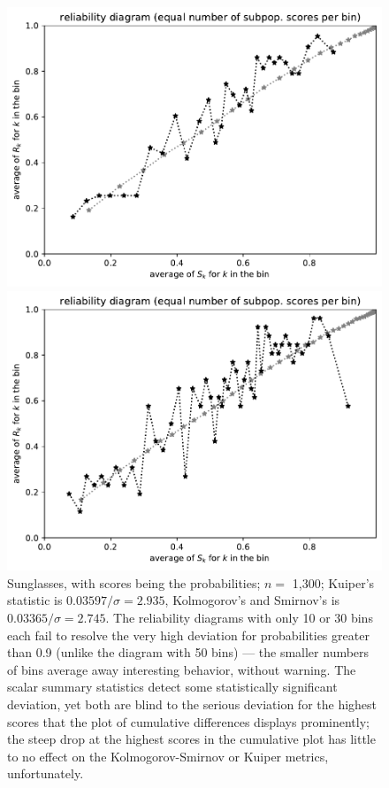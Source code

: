 \documentclass{article}
\begin{document}
\begin{figure}
\begin{centering}
\parbox{\imsize}{\includegraphics[width=\imsize]
{./codes/unweighted/prob-1-837-sunglasses-dark-glasses-shadesequisamps30}}
\quad\quad
\parbox{\imsize}{\includegraphics[width=\imsize]
{./codes/unweighted/prob-1-837-sunglasses-dark-glasses-shadesequisamps50}}

\end{centering}
\caption{Sunglasses, with scores being the probabilities;
         $n =$ 1,300; Kuiper's statistic is $0.03597 / \sigma = 2.935$,
         Kolmogorov's and Smirnov's is $0.03365 / \sigma = 2.745$.
The reliability diagrams with only 10 or 30 bins each
fail to resolve the very high deviation
for probabilities greater than 0.9 (unlike the diagram with 50 bins) ---
the smaller numbers of bins average away interesting behavior, without warning.
The scalar summary statistics detect some statistically significant deviation,
yet both are blind to the serious deviation for the highest scores
that the plot of cumulative differences displays prominently;
the steep drop at the highest scores in the cumulative plot
has little to no effect on the Kolmogorov-Smirnov or Kuiper metrics,
unfortunately.
}
\label{sunglasses-dark-glasses-shades-prob}
\end{figure}
\end{document}
